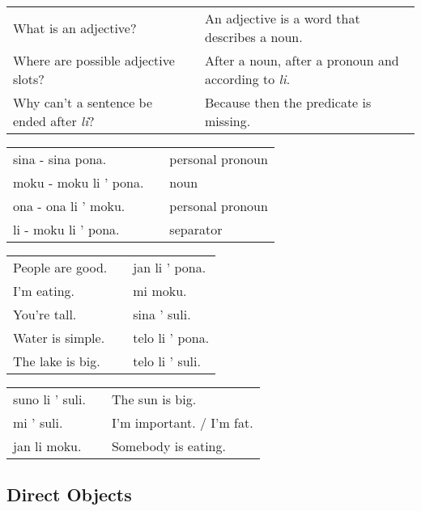 \begin{supertabular}{p{5,5cm}|ll}
    What is an adjective?                                                         &  & An adjective is a word that describes a noun.                              \\
    Where are possible adjective slots?                                           &  & After a noun, after a pronoun and according to \textit{li}.                \\
    Why can't a sentence be ended after \textit{li}?                              &  & Because then the predicate is missing.                                     \\
\end{supertabular}

\begin{supertabular}{p{5,5cm}|ll}
    sina - sina pona.      &  & personal pronoun \\
    moku - moku li ' pona. &  & noun             \\
    ona - ona li ' moku.   &  & personal pronoun \\
    li - moku li ' pona.   &  & separator        \\
\end{supertabular}

\begin{supertabular}{p{5,5cm}|ll}
    People are good. &  & jan li ' pona.  \\
    I'm eating.      &  & mi moku.        \\
    You're tall.     &  & sina ' suli.    \\
    Water is simple. &  & telo li ' pona. \\
    The lake is big. &  & telo li ' suli. \\
\end{supertabular}

\begin{supertabular}{p{5,5cm}|ll}
    suno li ' suli. &  & The sun is big.           \\
    mi ' suli.      &  & I'm important. / I'm fat. \\
    jan li moku.    &  & Somebody is eating.       \\
\end{supertabular}

\newpage
\subsection*{Direct Objects}
\label{'direct_objects_compund_sentences'}

